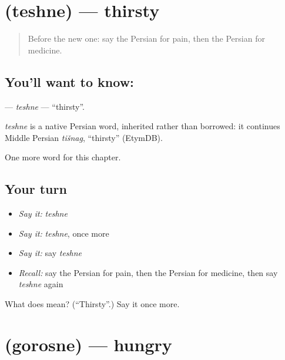\section[\texorpdfstring{\fa{تشنه} (teshne)}{تشنه (teshne)}]{ (teshne) — thirsty}

\label{lesson:FA-C31-teshne}



\begin{quote}
Before the new one: say the Persian for pain, then the Persian for medicine.
\end{quote}

\subsection*{You'll want to know: }
\textbf{} — \emph{teshne} — \textquotedblleft{}thirsty\textquotedblright{}.

\begin{cousinweb}
\emph{teshne} is a native Persian word, inherited rather than borrowed: it continues Middle Persian \emph{tišnag}, \textquotedblleft{}thirsty\textquotedblright{} (EtymDB).
\end{cousinweb}

\begin{grammarlens}[title={What you've built}]
One more word for this chapter.
\end{grammarlens}

\subsection*{Your turn}
\begin{itemize}
\raggedright
  \item \emph{Say it:} \emph{teshne}
  \item \emph{Say it:} \emph{teshne}, once more
  \item \emph{Say it:} say \emph{teshne}
  \item \emph{Recall:} say the Persian for pain, then the Persian for medicine, then say \emph{teshne} again
\end{itemize}

\begin{tcolorbox}[breakable,colback=teal!4,colframe=teal!35!black,title={Before you move on}]
What does  mean? (\textquotedblleft{}Thirsty\textquotedblright{}.) Say it once more.
\end{tcolorbox}
\section[\texorpdfstring{\fa{گرسنه} (gorosne)}{گرسنه (gorosne)}]{ (gorosne) — hungry}

